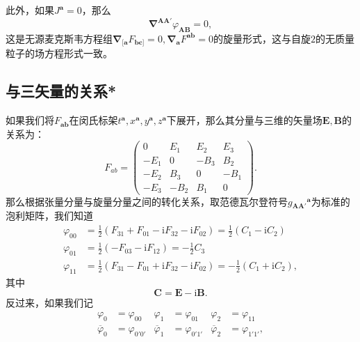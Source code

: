 此外，如果$J^{\boldsymbol{a}} =0$，那么
\begin{equation*}
	\boldsymbol{\nabla }^{\boldsymbol{AA} '} \varphi _{\boldsymbol{AB}} =0,
\end{equation*}
这是无源麦克斯韦方程组$\boldsymbol{\nabla }_{[\boldsymbol{a}} F_{\boldsymbol{bc}]} =0,\boldsymbol{\nabla }_{\boldsymbol{a}} F^{\boldsymbol{ab}} =0$的旋量形式，这与自旋$2$的无质量粒子的场方程形式一致。


\subsection{与三矢量的关系*}

如果我们将$F_{\boldsymbol{ab}}$在闵氏标架$t^{\boldsymbol{a}} ,x^{\boldsymbol{a}} ,y^{\boldsymbol{a}} ,z^{\boldsymbol{a}}$下展开，那么其分量与三维的矢量场$\boldsymbol{E} ,\boldsymbol{B}$的关系为：
\begin{equation}
	F_{ab} =\begin{pmatrix}
		0 & E_{1} & E_{2} & E_{3}\\
		-E_{1} & 0 & -B_{3} & B_{2}\\
		-E_{2} & B_{3} & 0 & -B_{1}\\
		-E_{3} & -B_{2} & B_{1} & 0
	\end{pmatrix} .
	\label{eq:6.15}
\end{equation}
那么根据张量分量与旋量分量之间的转化关系，取范德瓦尔登符号$g{_{\boldsymbol{AA} '}}^{\boldsymbol{a}}$为标准的泡利矩阵，我们知道
\begin{equation}
	\begin{aligned}
		\varphi _{00} & =\frac{1}{2} (F_{31} +F_{01} -\mathrm{i} F_{32} -\mathrm{i} F_{02} )=\frac{1}{2}( C_{1} -\mathrm{i} C_{2})\\
		\varphi _{01} & =\frac{1}{2} (-F_{03} -\mathrm{i} F_{12} )=-\frac{1}{2} C_{3}\\
		\varphi _{11} & =\frac{1}{2}( F_{31} -F_{01} +\mathrm{i} F_{32} -\mathrm{i} F_{02}) =-\frac{1}{2}( C_{1} +\mathrm{i} C_{2}) ,
	\end{aligned}
	\label{eq:6.16}
\end{equation}
其中
\begin{equation}
	\boldsymbol{C} =\boldsymbol{E} -\mathrm{i}\boldsymbol{B} .
	\label{eq:6.17}
\end{equation}
反过来，如果我们记
\begin{equation}
	\begin{aligned}
		\varphi _{0} & =\varphi _{00} & \varphi _{1} & =\varphi _{01} & \varphi _{2} & =\varphi _{11}\\
		\overline{\varphi }_{0} & =\varphi _{0'0'} & \overline{\varphi }_{1} & =\varphi _{0'1'} & \overline{\varphi }_{2} & =\varphi _{1'1'} ,
	\end{aligned}
	\label{eq:6.18}
\end{equation}
